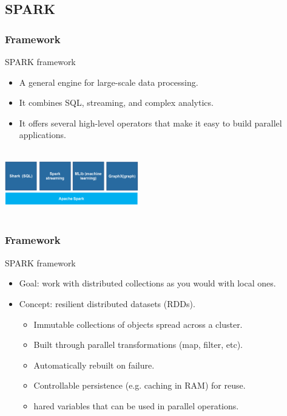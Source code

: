 % 


\subsection{SPARK}
\begin{frame}
\frametitle{Framework}
\begin{block}{SPARK framework}
\begin{itemize}
\item A general engine for large-scale data processing.
\item It combines SQL, streaming, and complex analytics.
\item It offers several high-level operators that make it easy to build parallel applications.
\end{itemize}

\end{block}

\centering
 \includegraphics[width=220px, height=110px]{figs/12/spark.eps}
\end{frame}

\begin{frame}
\frametitle{Framework}
\begin{block}{SPARK framework}
\begin{itemize}
\item Goal: work with distributed collections as you would with local ones.
\item Concept: resilient distributed datasets (RDDs).
    \begin{itemize}
    \item Immutable collections of objects spread across a cluster. 
    \item Built through parallel transformations (map, filter, etc). 
    \item Automatically rebuilt on failure.
    \item Controllable persistence (e.g. caching in RAM) for reuse.
    \item hared variables that can be used in parallel operations. 
    \end{itemize}
\end{itemize}

\end{block}

\end{frame}

